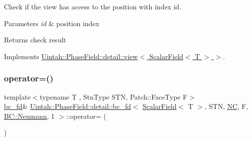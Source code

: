 Check if the view has access to the position with index id. 


\begin{DoxyParams}{Parameters}
{\em id} & position index \\
\hline
\end{DoxyParams}
\begin{DoxyReturn}{Returns}
check result 
\end{DoxyReturn}


Implements \hyperlink{classUintah_1_1PhaseField_1_1detail_1_1view_3_01ScalarField_3_01T_01_4_01_4_a9a950513dacd6468658436b737c3314f}{Uintah\+::\+Phase\+Field\+::detail\+::view$<$ Scalar\+Field$<$ T $>$ $>$}.

\mbox{\label{classUintah_1_1PhaseField_1_1detail_1_1bc__fd_3_01ScalarField_3_01T_01_4_00_01STN_00_01NC_00_01F_00_01BC_1_1Neumann_00_011_01_4_a44a1f3c1dfd7206a4f3f79b103325b07}} 
\subsubsection{\texorpdfstring{operator=()}{operator=()}}
{\footnotesize\ttfamily template$<$typename T , Stn\+Type S\+TN, Patch\+::\+Face\+Type F$>$ \\
\hyperlink{classUintah_1_1PhaseField_1_1detail_1_1bc__fd}{bc\+\_\+fd}\& \hyperlink{classUintah_1_1PhaseField_1_1detail_1_1bc__fd}{Uintah\+::\+Phase\+Field\+::detail\+::bc\+\_\+fd}$<$ \hyperlink{structUintah_1_1PhaseField_1_1ScalarField}{Scalar\+Field}$<$ T $>$, S\+TN, \hyperlink{namespaceUintah_1_1PhaseField_a33d355affda78a83f45755ba8388cedda77924170fe82bfd58b74ca3e44139718}{NC}, F, \hyperlink{namespaceUintah_1_1PhaseField_a148fba372aa3be96fd6eede7a2fa10b5ab8537a769dbc90cb1762215441212152}{B\+C\+::\+Neumann}, 1 $>$\+::operator= (\begin{DoxyParamCaption}\item[{const \hyperlink{classUintah_1_1PhaseField_1_1detail_1_1bc__fd}{bc\+\_\+fd}$<$ \hyperlink{structUintah_1_1PhaseField_1_1ScalarField}{Scalar\+Field}$<$ T $>$, S\+TN, \hyperlink{namespaceUintah_1_1PhaseField_a33d355affda78a83f45755ba8388cedda77924170fe82bfd58b74ca3e44139718}{NC}, F, \hyperlink{namespaceUintah_1_1PhaseField_a148fba372aa3be96fd6eede7a2fa10b5ab8537a769dbc90cb1762215441212152}{B\+C\+::\+Neumann}, 1 $>$ \&}]{ }\end{DoxyParamCaption})\hspace{0.3cm}{\ttfamily [delete]}}



